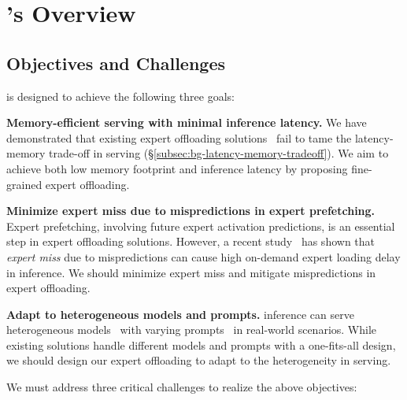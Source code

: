 \section{\sys's Overview} 

\subsection{Objectives and Challenges}

\sys is designed to achieve the following three goals: 

\textbf{Memory-efficient \MoE serving with minimal inference latency.}
We have demonstrated that existing expert offloading  solutions~\cite{eliseev2023fast,song2024promoe,xue2024moe} fail to tame the latency-memory trade-off in \MoE serving (\S\ref{subsec:bg-latency-memory-tradeoff}). 
We aim to achieve both low memory footprint and inference latency by proposing fine-grained expert offloading.

\textbf{Minimize expert miss due to mispredictions in expert prefetching.}
Expert prefetching, involving future expert activation predictions, is an essential step in expert offloading solutions. 
However, a recent study~\cite{song2024promoe} has shown that \textit{expert miss} due to mispredictions can cause high on-demand expert loading delay in inference.
We should minimize expert miss and mitigate mispredictions in expert offloading.


\textbf{Adapt to heterogeneous \MoE models and prompts.}
%
\MoE inference can serve heterogeneous models~\cite{jiang2024mixtral,dai2024deepseekmoe,yang2024qwen2,snowflake-arctic,xai-grok} with varying prompts~\cite{zheng2023lmsys,sharegpt} in real-world scenarios.
%
While existing solutions handle different models and prompts with a one-fits-all design, we should design our expert offloading to adapt to the heterogeneity in \MoE serving.

We must address three critical challenges to realize the above objectives:

